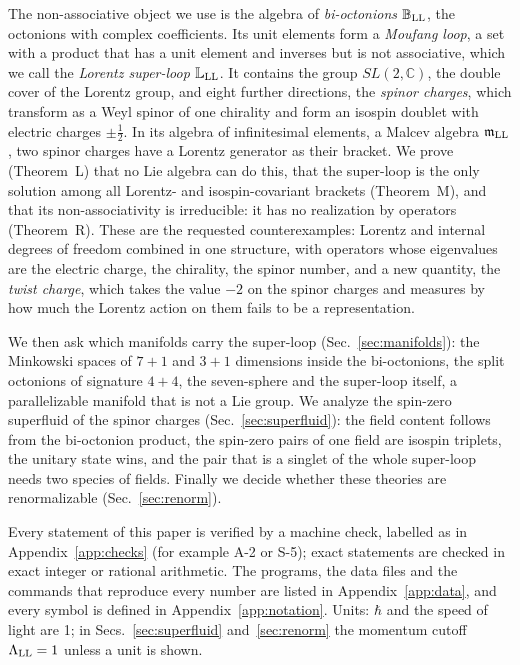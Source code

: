 The non-associative object we use is the algebra of \emph{bi-octonions} $\mathbb B_{\rm LL}$, the
octonions with complex coefficients. Its unit elements form a \emph{Moufang loop}, a set with a
product that has a unit element and inverses but is not associative, which we call the
\emph{Lorentz super-loop} $\mathbb L_{\rm LL}$. It contains the group $SL(2,\mathbb C)$, the double cover of the
Lorentz group, and eight further directions, the \emph{spinor charges}, which transform as a Weyl
spinor of one chirality and form an isospin doublet with electric charges $\pm\tfrac12$. In its
algebra of infinitesimal elements, a Malcev algebra $\mathfrak m_{\rm LL}$, two spinor charges have a
Lorentz generator as their bracket. We prove (Theorem~L) that no Lie algebra can do this, that the
super-loop is the only solution among all Lorentz- and isospin-covariant brackets (Theorem~M), and
that its non-associativity is irreducible: it has no realization by operators (Theorem~R). These are
the requested counterexamples: Lorentz and internal degrees of freedom combined in one structure, with
operators whose eigenvalues are the electric charge, the chirality, the spinor number, and a new
quantity, the \emph{twist charge}, which takes the value $-2$ on the spinor charges and measures by how
much the Lorentz action on them fails to be a representation.

We then ask which manifolds carry the super-loop (Sec.~\ref{sec:manifolds}): the Minkowski spaces of
$7+1$ and $3+1$ dimensions inside the bi-octonions, the split octonions of signature $4+4$, the
seven-sphere and the super-loop itself, a parallelizable manifold that is not a Lie group. We analyze
the spin-zero superfluid of the spinor charges (Sec.~\ref{sec:superfluid}): the field content follows
from the bi-octonion product, the spin-zero pairs of one field are isospin triplets, the unitary state
wins, and the pair that is a singlet of the whole super-loop needs two species of fields. Finally we
decide whether these theories are renormalizable (Sec.~\ref{sec:renorm}).

Every statement of this paper is verified by a machine check, labelled as in Appendix~\ref{app:checks}
(for example A-2 or S-5); exact statements are checked in exact integer or rational arithmetic. The
programs, the data files and the commands that reproduce every number are listed in
Appendix~\ref{app:data}, and every symbol is defined in Appendix~\ref{app:notation}. Units: $\hbar$ and
the speed of light are 1; in Secs.~\ref{sec:superfluid} and~\ref{sec:renorm} the momentum cutoff
$\Lambda_{\rm LL}=1$ unless a unit is shown.

